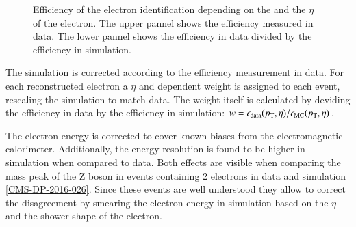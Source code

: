 \begin{figure}[htbp!]
  \begin{center}
\caption{Efficiency of the electron identification depending on the \pt and the $\eta$ of the electron\cite{CMS-DP-2017-004}.
         The upper pannel shows the efficiency measured in data. The lower pannel shows the efficiency in data divided by the efficiency in simulation. 
  \label{fig:reco_eleeff}}
  \end{center}
\end{figure}

The simulation is corrected according to the efficiency measurement in data. For each reconstructed electron a $\eta$ and \pt dependent weight is assigned to each event,
rescaling the simulation to match data. The weight itself is calculated by deviding the efficiency in data by the efficiency in simulation: $w = \epsilon_{\mathrm{data}} (p_{\mathrm{T}},\eta) /\epsilon_{\mathrm{MC}} (p_{\mathrm{T}},\eta)$.

The electron energy is corrected to cover known biases from the electromagnetic calorimeter. Additionally, the energy resolution is found to be higher in simulation when compared to data.
Both effects are visible when comparing the mass peak of the Z boson in events containing 2 electrons in data and simulation \ref{CMS-DP-2016-026}.
Since these events are well understood they allow to correct the disagreement by smearing the electron energy in simulation based on the $\eta$ and the shower shape of the electron.

